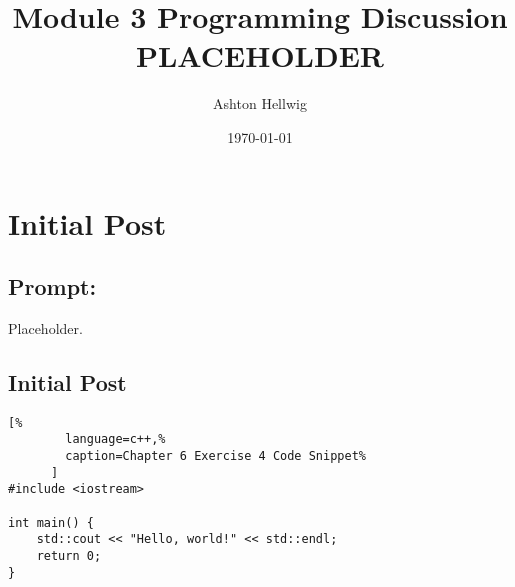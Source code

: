 \documentclass[a4paper, 11pt]{article}
\title{%
    Module 3 Programming Discussion\\%
    \large{PLACEHOLDER}
  }
\author{Ashton Hellwig}
\date\today
\begin{document}
  \maketitle
  \tableofcontents
  \newpage

  \section{Initial Post}
    \subsection{Prompt:}
      \begin{mdframed}[style=AnswerFrame,nobreak=true,align=center]
        Placeholder.
      \end{mdframed}

    \subsection{Initial Post}
      \begin{lstlisting}[%
        language=c++,%
        caption=Chapter 6 Exercise 4 Code Snippet%
      ]
#include <iostream>

int main() {
    std::cout << "Hello, world!" << std::endl;
    return 0;
}
      \end{lstlisting}



  \newpage
  \nocite{textbook}
  \printbibliography[%
    heading=bibintoc,%
    title={Works Consulted}%
  ]
\end{document}
